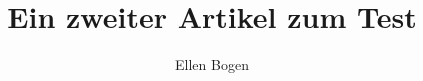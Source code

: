 \documentclass{dtk2}
\author{Ellen Bogen}
\begin{document}
\title{Ein zweiter Artikel zum Test}

\maketitle

\blinddocument

%
\end{document}
